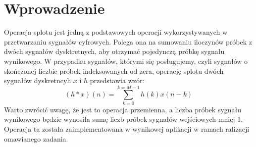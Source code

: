 \documentclass[12pt]{article}
\begin{document}
    \section{Wprowadzenie} {
        Operacja splotu jest jedną z podstawowych operacji wykorzystywanych w przetwarzaniu sygnałów
        cyfrowych. Polega ona na sumowaniu iloczynów próbek z dwóch sygnałów dysktretnych, aby
        otrzymać pojedynczą próbkę sygnału wynikowego. W przypadku sygnałów, którymi się
        posługujemy, czyli sygnałów o skończonej liczbie próbek indeksowanych od zera, operację
        splotu dwóch sygnałów dyskretncyh $x$ i $h$ przedstawia wzór:
        \begin{equation}
            (h \ast x)(n) = \sum_{k = 0}^{k = M - 1}h(k)x(n - k) \label{wzor:splot}
        \end{equation}
        Warto zwrócić uwagę, że jest to operacja przemienna, a liczba próbek sygnału wynikowego
        będzie wynosiła sumę liczb próbek sygnałów wejściowych mniej 1. Operacja ta została
        zaimplementowana w wynikowej aplikacji w ramach ralizacji omawianego zadania.

}
\end{document}
